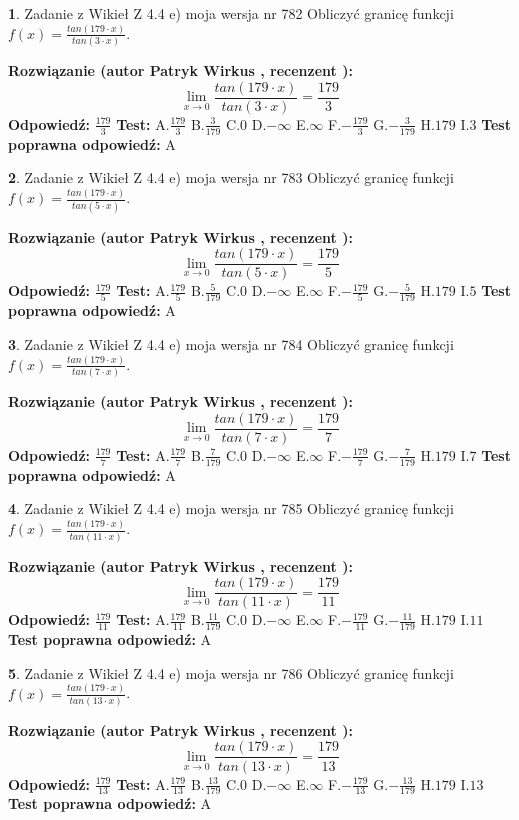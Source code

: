 \documentclass[12pt, a4paper]{article}
\theoremstyle{definition} %
\newtheorem{zad}{}
\newcommand{\zadStart}[1]{\begin{zad}#1\newline}
\newcommand{\zadStop}{\end{zad}}
\newcommand{\rozwStart}[2]{\noindent \textbf{Rozwiązanie (autor #1 , recenzent #2): }\newline}
\newcommand{\rozwStop}{\newline}
\newcommand{\odpStart}{\noindent \textbf{Odpowiedź:}\newline}
\newcommand{\odpStop}{\newline}
\newcommand{\testStart}{\noindent \textbf{Test:}\newline}
\newcommand{\testStop}{\newline}
\newcommand{\kluczStart}{\noindent \textbf{Test poprawna odpowiedź:}\newline}
\newcommand{\kluczStop}{\newline}
\begin{document}
\zadStart{Zadanie z Wikieł Z 4.4 e) moja wersja nr 782}
Obliczyć granicę funkcji $f(x)=\frac{tan(179\cdot x)}{tan(3\cdot x)}$.
\zadStop
\rozwStart{Patryk Wirkus}{}
$$\lim\limits_{x\to 0}\frac{tan(179\cdot x)}{tan(3\cdot x)}=
\frac{179}{3}$$
\rozwStop
\odpStart
$\frac{179}{3}$
\odpStop
\testStart
A.$\frac{179}{3}$
B.$\frac{3}{179}$
C.$0$
D.$-\infty$
E.$\infty$
F.$-\frac{179}{3}$
G.$-\frac{3}{179}$
H.$179$
I.$3$
\testStop
\kluczStart
A
\kluczStop



\zadStart{Zadanie z Wikieł Z 4.4 e) moja wersja nr 783}
Obliczyć granicę funkcji $f(x)=\frac{tan(179\cdot x)}{tan(5\cdot x)}$.
\zadStop
\rozwStart{Patryk Wirkus}{}
$$\lim\limits_{x\to 0}\frac{tan(179\cdot x)}{tan(5\cdot x)}=
\frac{179}{5}$$
\rozwStop
\odpStart
$\frac{179}{5}$
\odpStop
\testStart
A.$\frac{179}{5}$
B.$\frac{5}{179}$
C.$0$
D.$-\infty$
E.$\infty$
F.$-\frac{179}{5}$
G.$-\frac{5}{179}$
H.$179$
I.$5$
\testStop
\kluczStart
A
\kluczStop



\zadStart{Zadanie z Wikieł Z 4.4 e) moja wersja nr 784}
Obliczyć granicę funkcji $f(x)=\frac{tan(179\cdot x)}{tan(7\cdot x)}$.
\zadStop
\rozwStart{Patryk Wirkus}{}
$$\lim\limits_{x\to 0}\frac{tan(179\cdot x)}{tan(7\cdot x)}=
\frac{179}{7}$$
\rozwStop
\odpStart
$\frac{179}{7}$
\odpStop
\testStart
A.$\frac{179}{7}$
B.$\frac{7}{179}$
C.$0$
D.$-\infty$
E.$\infty$
F.$-\frac{179}{7}$
G.$-\frac{7}{179}$
H.$179$
I.$7$
\testStop
\kluczStart
A
\kluczStop



\zadStart{Zadanie z Wikieł Z 4.4 e) moja wersja nr 785}
Obliczyć granicę funkcji $f(x)=\frac{tan(179\cdot x)}{tan(11\cdot x)}$.
\zadStop
\rozwStart{Patryk Wirkus}{}
$$\lim\limits_{x\to 0}\frac{tan(179\cdot x)}{tan(11\cdot x)}=
\frac{179}{11}$$
\rozwStop
\odpStart
$\frac{179}{11}$
\odpStop
\testStart
A.$\frac{179}{11}$
B.$\frac{11}{179}$
C.$0$
D.$-\infty$
E.$\infty$
F.$-\frac{179}{11}$
G.$-\frac{11}{179}$
H.$179$
I.$11$
\testStop
\kluczStart
A
\kluczStop



\zadStart{Zadanie z Wikieł Z 4.4 e) moja wersja nr 786}
Obliczyć granicę funkcji $f(x)=\frac{tan(179\cdot x)}{tan(13\cdot x)}$.
\zadStop
\rozwStart{Patryk Wirkus}{}
$$\lim\limits_{x\to 0}\frac{tan(179\cdot x)}{tan(13\cdot x)}=
\frac{179}{13}$$
\rozwStop
\odpStart
$\frac{179}{13}$
\odpStop
\testStart
A.$\frac{179}{13}$
B.$\frac{13}{179}$
C.$0$
D.$-\infty$
E.$\infty$
F.$-\frac{179}{13}$
G.$-\frac{13}{179}$
H.$179$
I.$13$
\testStop
\kluczStart
A
\kluczStop
\end{document}
